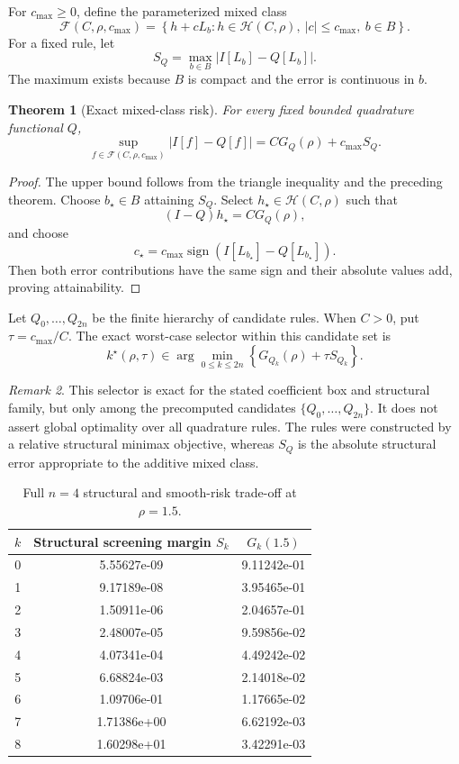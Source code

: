 \documentclass[preprint,12pt]{elsarticle}
\newtheorem{theorem}{Theorem}
\theoremstyle{remark}
\newtheorem{remark}[theorem]{Remark}
\begin{document}
For \(c_{\max}\geq0\), define the parameterized mixed class
\[
\mathcal F(C,\rho,c_{\max})
=
\left\{
h+cL_b:
h\in\mathcal H(C,\rho),\
|c|\leq c_{\max},\
b\in B
\right\}.
\]
For a fixed rule, let
\[
S_Q
=
\max_{b\in B}|I[L_b]-Q[L_b]|.
\]
The maximum exists because \(B\) is compact and the error is
continuous in \(b\).

\begin{theorem}[Exact mixed-class risk]
For every fixed bounded quadrature functional \(Q\),
\[
\sup_{f\in\mathcal F(C,\rho,c_{\max})}
|I[f]-Q[f]|
=
C G_Q(\rho)+c_{\max}S_Q.
\]
\end{theorem}

\begin{proof}
The upper bound follows from the triangle inequality and the preceding
theorem. Choose \(b_\star\in B\) attaining \(S_Q\). Select
\(h_\star\in\mathcal H(C,\rho)\) such that
\[
(I-Q)h_\star=C G_Q(\rho),
\]
and choose
\[
c_\star
=
c_{\max}
\operatorname{sign}
\left(I[L_{b_\star}]-Q[L_{b_\star}]\right).
\]
Then both error contributions have the same sign and their absolute
values add, proving attainability.
\end{proof}

Let \(Q_0,\ldots,Q_{2n}\) be the finite hierarchy of candidate rules.
When \(C>0\), put \(\tau=c_{\max}/C\). The exact worst-case selector
within this candidate set is
\[
k^\star(\rho,\tau)
\in
\arg\min_{0\leq k\leq2n}
\left\{
G_{Q_k}(\rho)+\tau S_{Q_k}
\right\}.
\]

\begin{remark}
This selector is exact for the stated coefficient box and structural
family, but only among the precomputed candidates
\(\{Q_0,\ldots,Q_{2n}\}\). It does not assert global optimality over all
quadrature rules. The rules were constructed by a relative structural
minimax objective, whereas \(S_Q\) is the absolute structural error
appropriate to the additive mixed class.
\end{remark}


\begin{table}[ht]
\centering
\caption{Full \(n=4\) structural and smooth-risk trade-off at
\(\rho=1.5\).}
\label{tab:risk-components}
\small
\begin{tabular}{ccc}
\toprule
\(k\) & Structural screening margin \(S_k\) & \(G_k(1.5)\)\\
\midrule
0 & 5.55627e-09 & 9.11242e-01 \\
1 & 9.17189e-08 & 3.95465e-01 \\
2 & 1.50911e-06 & 2.04657e-01 \\
3 & 2.48007e-05 & 9.59856e-02 \\
4 & 4.07341e-04 & 4.49242e-02 \\
5 & 6.68824e-03 & 2.14018e-02 \\
6 & 1.09706e-01 & 1.17665e-02 \\
7 & 1.71386e+00 & 6.62192e-03 \\
8 & 1.60298e+01 & 3.42291e-03 \\
\bottomrule
\end{tabular}
\end{table}
\end{document}
